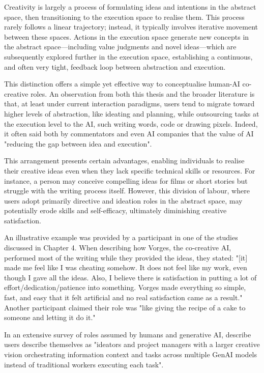 Creativity is largely a process of formulating ideas and intentions in the abstract space, then transitioning to the execution space to realise them. This process rarely follows a linear trajectory; instead, it typically involves iterative movement between these spaces. Actions in the execution space generate new concepts in the abstract space—including value judgments and novel ideas—which are subsequently explored further in the execution space, establishing a continuous, and often very tight, feedback loop between abstraction and execution.

This distinction offers a simple yet effective way to conceptualise human-AI co-creative roles. An observation from both this thesis and the broader literature is that, at least under current interaction paradigms, users tend to migrate toward higher levels of abstraction, like ideating and planning, while outsourcing tasks at the execution level to the AI, such writing words, code or drawing pixels. Indeed, it often said both by commentators and even AI companies that the value of AI "reducing the gap between idea and execution".

This arrangement presents certain advantages, enabling individuals to realise their creative ideas even when they lack specific technical skills or resources. For instance, a person may conceive compelling ideas for films or short stories but struggle with the writing process itself. However, this division of labour, where users adopt primarily directive and ideation roles in the abstract space, may potentially erode skills and self-efficacy, ultimately diminishing creative satisfaction.

An illustrative example was provided by a participant in one of the studies discussed in Chapter 4. When describing how Vorges, the co-creative AI, performed most of the writing while they provided the ideas, they stated: "[it] made me feel like I was cheating somehow. It does not feel like my work, even though I gave all the ideas. Also, I believe there is satisfaction in putting a lot of effort/dedication/patience into something. Vorges made everything so simple, fast, and easy that it felt artificial and no real satisfaction came as a result." Another participant claimed their role was "like giving the recipe of a cake to someone and letting it do it."


In an extensive survey of roles assumed by humans and generative AI, \cite{Palani2024-on} describe users describe themselves as "ideators and project managers with a larger creative vision orchestrating information context and tasks across multiple GenAI models instead of traditional workers executing each task". 


